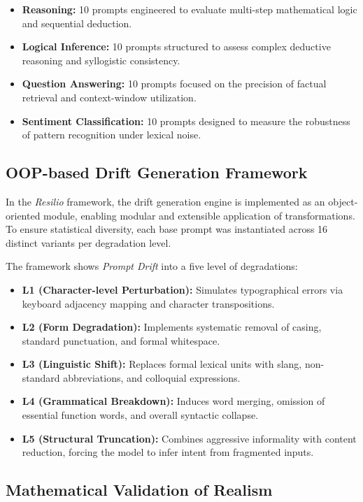 \documentclass[conference]{IEEEtran}
\begin{document}
\begin{itemize}
\item \textbf{Reasoning:} 10 prompts engineered to evaluate multi-step mathematical logic and sequential deduction.
\item \textbf{Logical Inference:} 10 prompts structured to assess complex deductive reasoning and syllogistic consistency.
\item \textbf{Question Answering:} 10 prompts focused on the precision of factual retrieval and context-window utilization.
\item \textbf{Sentiment Classification:} 10 prompts designed to measure the robustness of pattern recognition under lexical noise.
\end{itemize}

\subsection{OOP-based Drift Generation Framework}

In the \textit{Resilio} framework, the drift generation engine is implemented as an object-oriented module, enabling modular and extensible application of transformations. To ensure statistical diversity, each base prompt was instantiated across 16 distinct variants per degradation level.

The framework shows \textit{Prompt Drift} into a five level of degradations:

\begin{itemize}
\item \textbf{L1 (Character-level Perturbation):} Simulates typographical errors via keyboard adjacency mapping and character transpositions.
\item \textbf{L2 (Form Degradation):} Implements systematic removal of casing, standard punctuation, and formal whitespace.
\item \textbf{L3 (Linguistic Shift):} Replaces formal lexical units with slang, non-standard abbreviations, and colloquial expressions.
\item \textbf{L4 (Grammatical Breakdown):} Induces word merging, omission of essential function words, and overall syntactic collapse.
\item \textbf{L5 (Structural Truncation):} Combines aggressive informality with content reduction, forcing the model to infer intent from fragmented inputs.
\end{itemize}

\subsection{Mathematical Validation of Realism}
\end{document}
